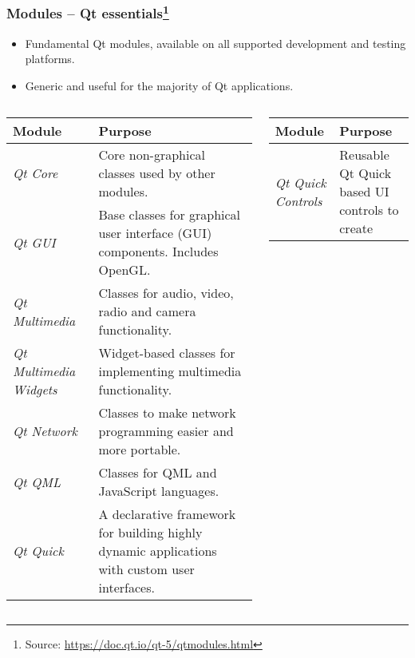 \begin{frame}
  \frametitle{Modules -- Qt essentials\footnote
  {\tiny Source: \url{https://doc.qt.io/qt-5/qtmodules.html}}}

  \small
  \begin{itemize}
  \item Fundamental Qt modules, available on all supported development and
    testing platforms.
  \item Generic and useful for the majority of Qt applications.
  \end{itemize}

  \tiny
  \begin{columns}
    \begin{column}{0.48\textwidth}
      \begin{tabular}{|p{}|p{}|}
      \hline
      \textbf{Module} & \textbf{Purpose} \\
      \hline
      {\em Qt Core} & Core non-graphical classes used by other modules. \\
      \hline
      {\em Qt GUI} & Base classes for graphical user interface (GUI) components.
        Includes OpenGL. \\
      \hline
      {\em Qt Multimedia} & Classes for audio, video, radio and camera functionality. \\
      \hline
      {\em Qt Multimedia Widgets} & Widget-based classes for implementing
        multimedia functionality. \\
      \hline
      {\em Qt Network} & Classes to make network programming easier and more portable. \\
      \hline
      {\em Qt QML} & Classes for QML and JavaScript languages. \\
      \hline
      {\em Qt Quick} & A declarative framework for building highly dynamic
        applications with custom user interfaces. \\
      \hline
      \end{tabular}
    \end{column}
    \begin{column}{0.48\textwidth}
      \begin{tabular}{|p{}|p{}|}
      \hline
      \textbf{Module} & \textbf{Purpose} \\
      \hline
      {\em  Qt Quick Controls} & Reusable Qt Quick based UI controls to create

\end{tabular}
\end{column}
\end{columns}
\end{frame}
